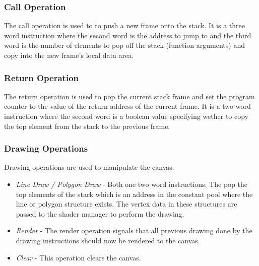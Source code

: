 \documentclass{l3proj}
\begin{document}
\subsubsection{Call Operation}
The call operation is used to to push a new frame onto the stack. It is a three word instruction where the second word is the address to jump to and the third word is the number of elements to pop off the stack (function arguments) and copy into the new frame’s local data area.

\subsubsection{Return Operation}
The return operation is used to pop the current stack frame and set the program counter to the value of the return address of the current frame. It is a two word instruction where the second word is a boolean value specifying wether to copy the top element from the stack to the previous frame.

\subsubsection{Drawing Operations }
Drawing operations are used to manipulate the canvas.
\begin{itemize}
	\item\textit{Line Draw / Polygon Draw} - Both one two word instructions. The pop the top elements of the stack which is an address in the constant pool where the line or polygon structure exists. The vertex data in these structures are passed to the shader manager to perform the drawing.
	\item\textit{Render} - The render operation signals that all previous drawing done by the drawing instructions should now be rendered to the canvas.
	\item\textit{Clear} - This operation clears the canvas.
\end{itemize}
\end{document}
